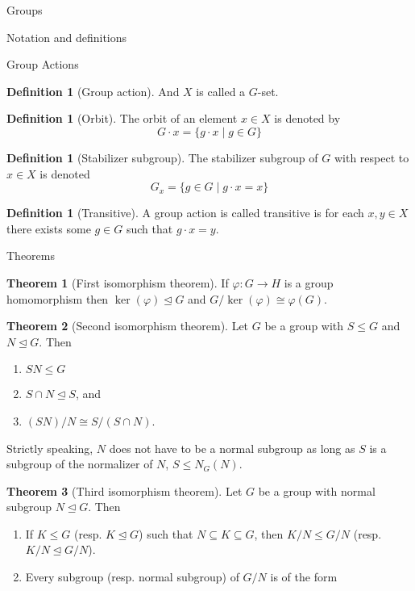 \documentclass{article}
\theoremstyle{definition}
\newtheorem{theorem}{Theorem}
\numberwithin{theorem}{subsection} %
\theoremstyle{remark}
\theoremstyle{definition}
\newtheorem{definition}[paragraph]{Definition}
\newcommand{\set}[1]{\{#1\}}
\begin{document}
\begin{section}{Groups}
\begin{subsection}{Notation and definitions}
\begin{subsubsection}{Group Actions}
\begin{definition}[Group action]
        And $X$ is called a $G$-set.
      \end{definition}
      \begin{definition}[Orbit]
        The orbit of an element $x \in X$ is denoted by \[
          G \cdot x = \set{g \cdot x \mid g \in G}
        \]
      \end{definition}
      \begin{definition}[Stabilizer subgroup]
        The stabilizer subgroup of $G$ with respect to $x \in X$ is denoted \[
          G_x = \set{g \in G \mid g \cdot x = x}
        \]
      \end{definition}
      \begin{definition}[Transitive]
        A group action is called transitive is for each $x, y \in X$ there
        exists some $g \in G$ such that $g \cdot x = y$.
      \end{definition}
    \end{subsubsection}
  \end{subsection}
  \begin{subsection}{Theorems}
    \begin{theorem}[First isomorphism theorem]
      If $\varphi\colon G \rightarrow H$ is a group homomorphism then
      $\ker(\varphi) \trianglelefteq G$ and $G/\ker(\varphi) \cong \varphi(G)$.
    \end{theorem}
    \begin{theorem}[Second isomorphism theorem]
      Let $G$ be a group with $S \leq G$ and $N \trianglelefteq G$. Then
      \begin{enumerate}
        \item $SN \leq G$
        \item $S \cap N \trianglelefteq S$, and
        \item $(SN)/N \cong S/(S \cap N)$.
      \end{enumerate}
    \end{theorem}
    Strictly speaking, $N$ does not have to be a normal subgroup as long as $S$
    is a subgroup of the normalizer of $N$, $S \leq N_G(N)$.
    \begin{theorem}[Third isomorphism theorem]
      Let $G$ be a group with normal subgroup $N \trianglelefteq G$. Then
      \begin{enumerate}
        \item If $K \leq G$ (resp. $K \trianglelefteq G$) such that
        $N \subseteq K \subseteq G$, then $K/N \leq G/N$
        (resp. $K/N \trianglelefteq G/N$).
        \item Every subgroup (resp. normal subgroup) of $G/N$ is of the form

\end{enumerate}
\end{theorem}
\end{subsection}
\end{section}
\end{document}
